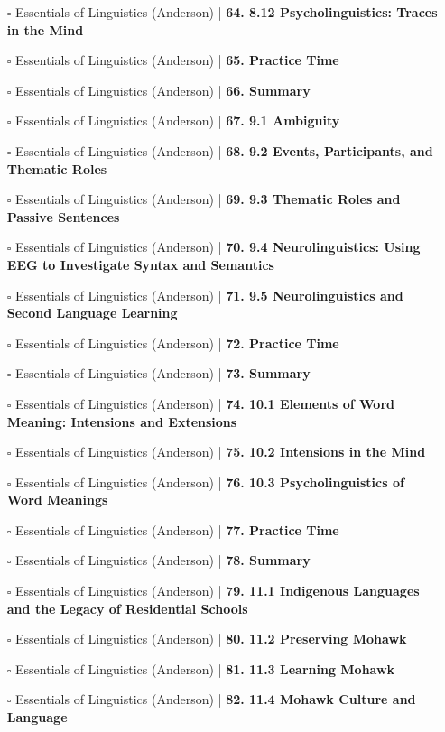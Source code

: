 \documentclass[a4, landscape, 12pt]{article}
\newcommand{\checkbox}{$\square$}%
\begin{document}
\begin{itemize}
{}
\item [\checkbox]  Essentials of Linguistics (Anderson) | \textbf{ 64. 8.12 Psycholinguistics: Traces in the Mind
}
\item [\checkbox]  Essentials of Linguistics (Anderson) | \textbf{ 65. Practice Time
}
\item [\checkbox]  Essentials of Linguistics (Anderson) | \textbf{ 66. Summary
}
\item [\checkbox]  Essentials of Linguistics (Anderson) | \textbf{ 67. 9.1 Ambiguity
}
\item [\checkbox]  Essentials of Linguistics (Anderson) | \textbf{ 68. 9.2 Events, Participants, and Thematic Roles
}
\item [\checkbox]  Essentials of Linguistics (Anderson) | \textbf{ 69. 9.3 Thematic Roles and Passive Sentences
}
\item [\checkbox]  Essentials of Linguistics (Anderson) | \textbf{ 70. 9.4 Neurolinguistics: Using EEG to Investigate Syntax and Semantics
}
\item [\checkbox]  Essentials of Linguistics (Anderson) | \textbf{ 71. 9.5 Neurolinguistics and Second Language Learning
}
\item [\checkbox]  Essentials of Linguistics (Anderson) | \textbf{ 72. Practice Time
}
\item [\checkbox]  Essentials of Linguistics (Anderson) | \textbf{ 73. Summary
}
\item [\checkbox]  Essentials of Linguistics (Anderson) | \textbf{ 74. 10.1 Elements of Word Meaning: Intensions and Extensions
}
\item [\checkbox]  Essentials of Linguistics (Anderson) | \textbf{ 75. 10.2 Intensions in the Mind
}
\item [\checkbox]  Essentials of Linguistics (Anderson) | \textbf{ 76. 10.3 Psycholinguistics of Word Meanings
}
\item [\checkbox]  Essentials of Linguistics (Anderson) | \textbf{ 77. Practice Time
}
\item [\checkbox]  Essentials of Linguistics (Anderson) | \textbf{ 78. Summary
}
\item [\checkbox]  Essentials of Linguistics (Anderson) | \textbf{ 79. 11.1 Indigenous Languages and the Legacy of Residential Schools
}
\item [\checkbox]  Essentials of Linguistics (Anderson) | \textbf{ 80. 11.2 Preserving Mohawk
}
\item [\checkbox]  Essentials of Linguistics (Anderson) | \textbf{ 81. 11.3 Learning Mohawk
}
\item [\checkbox]  Essentials of Linguistics (Anderson) | \textbf{ 82. 11.4 Mohawk Culture and Language
}
\end{itemize}
\end{document}
